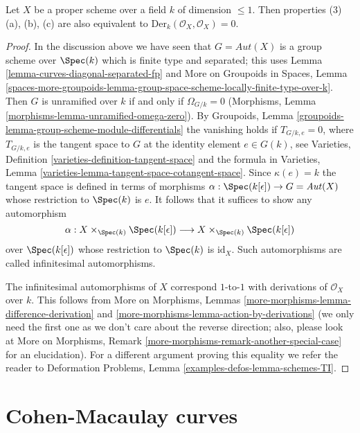 \begin{lemma}
\label{lemma-in-DM-locus-vector-fields}
Let $X$ be a proper scheme over a field $k$ of dimension $\leq 1$.
Then properties (3)(a), (b), (c) are also equivalent to
$\text{Der}_k(\mathcal{O}_X, \mathcal{O}_X) = 0$.
\end{lemma}

\begin{proof}
In the discussion above we have seen that $G = \mathit{Aut}(X)$
is a group scheme over $\Spec(k)$ which is finite type and separated;
this uses Lemma \ref{lemma-curves-diagonal-separated-fp} and
More on Groupoids in Spaces, Lemma
\ref{spaces-more-groupoids-lemma-group-space-scheme-locally-finite-type-over-k}.
Then $G$ is unramified over $k$ if and only if $\Omega_{G/k} = 0$
(Morphisms, Lemma \ref{morphisms-lemma-unramified-omega-zero}).
By Groupoids, Lemma \ref{groupoids-lemma-group-scheme-module-differentials}
the vanishing holds if $T_{G/k, e} = 0$, where $T_{G/k, e}$ is the tangent
space to $G$ at the identity element $e \in G(k)$, see
Varieties, Definition \ref{varieties-definition-tangent-space}
and the formula in
Varieties, Lemma \ref{varieties-lemma-tangent-space-cotangent-space}.
Since $\kappa(e) = k$ the tangent space is defined in terms of
morphisms $\alpha : \Spec(k[\epsilon]) \to G = \mathit{Aut}(X)$
whose restriction to $\Spec(k)$ is $e$.
It follows that it suffices to show any automorphism
$$
\alpha :
X \times_{\Spec(k)} \Spec(k[\epsilon])
\longrightarrow
X \times_{\Spec(k)} \Spec(k[\epsilon])
$$
over $\Spec(k[\epsilon])$ whose restriction to $\Spec(k)$ is
$\text{id}_X$. Such automorphisms are
called infinitesimal automorphisms.

\medskip\noindent
The infinitesimal automorphisms of $X$ correspond $1$-to-$1$
with derivations of $\mathcal{O}_X$ over $k$. This follows from
More on Morphisms, Lemmas \ref{more-morphisms-lemma-difference-derivation} and
\ref{more-morphisms-lemma-action-by-derivations} (we only need the first one
as we don't care about the reverse direction; also, please look at
More on Morphisms, Remark \ref{more-morphisms-remark-another-special-case}
for an elucidation). For a different argument proving this equality
we refer the reader to
Deformation Problems, Lemma \ref{examples-defos-lemma-schemes-TI}.
\end{proof}





\section{Cohen-Macaulay curves}
\label{section-CM}

